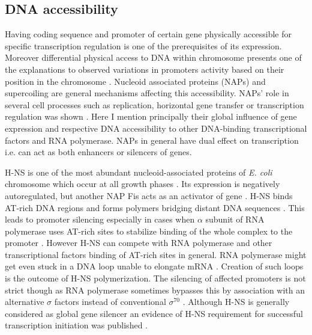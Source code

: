 
\subsection{DNA accessibility}
Having coding sequence and promoter of certain gene physically accessible for specific transcription regulation is one of the prerequisites of its expression.
Moreover differential physical access to DNA within chromosome presents one of the explanations to observed variations in promoters activity based on their position in the chromosome \cite{bryant2014chromosome}.
Nucleoid associated proteins (NAPs) and supercoiling are general mechanisms affecting this accessibility.
NAPs' role in several cell processes such as replication, horizontal gene transfer or transcription regulation was shown \cite{dixon1984protein, kayoko1992histone, aznar2013hha}.
Here I mention principally their global influence of gene expression and respective DNA accessibility to other DNA-binding transcriptional factors and RNA polymerase.
NAPs in general have dual effect on transcription i.e. can act as both enhancers or silencers of genes.

H-NS is one of the most abundant nucleoid-associated proteins of \textit{E. coli} chromosome which occur at all growth phases \cite{azam1999growth}.
Its expression is negatively autoregulated, but another NAP Fis acts as an activator of  gene \cite{ueguchi1993autoregulatory, falconi1996antagonistic}.
H-NS binds AT-rich DNA regions and forms polymers bridging distant DNA sequences  \cite{navarre2006selective, arold2010h}.
This leads to promoter silencing especially in cases when $\alpha$ subunit of RNA polymerase uses AT-rich sites to stabilize binding of the whole complex to the promoter \cite{singh2013h}.
However H-NS can compete with RNA polymerase and other transcriptional factors binding of AT-rich sites in general.
RNA polymerase might get even stuck in a DNA loop unable to elongate mRNA \cite{dame2002structural}.
Creation of such loops is the outcome of H-NS polymerization.
The silencing of affected promoters is not strict though as RNA polymerase sometimes bypasses this by association with an alternative $\sigma$ factors instead of conventional $\sigma^{70}$ \cite{grainger2008selective}.
Although H-NS is generally considered as global gene silencer an evidence of H-NS requirement for successful transcription initiation was published \cite{singh2013h}.

